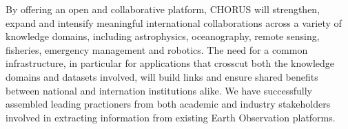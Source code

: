 \relax
By offering an open and collaborative platform, CHORUS will strengthen, expand and intensify meaningful international collaborations across a variety of knowledge domains, including astrophysics, oceanography, remote sensing, fisheries, emergency
management and robotics.  The need for a common infrastructure, in particular for applications that crosscut both the knowledge domains and datasets involved, will build links and ensure shared benefits between national and internation institutions alike.   We have successfully assembled leading practioners from both academic and industry stakeholders involved in extracting information from existing Earth Observation platforms.

